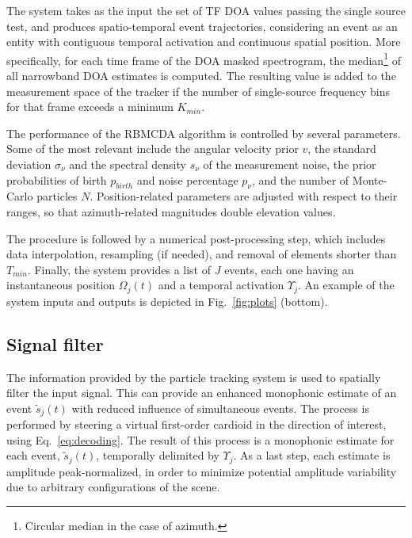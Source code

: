 The system takes as the input the set of TF DOA values passing the single source test, and produces spatio-temporal event trajectories, considering an event as an entity with contiguous temporal activation and continuous spatial position. 
More specifically, for each time frame of the DOA masked spectrogram, the median\footnote{Circular median in the case of azimuth.} of all narrowband DOA estimates is computed. The resulting value is added to the measurement space of the tracker if the number of single-source frequency bins for that frame exceeds a minimum $K_{min}$. 

The performance of the RBMCDA algorithm is controlled by several parameters. Some of the most relevant include the angular velocity prior $v$, the standard deviation $\sigma_{\nu}$ and the spectral density $s_{\nu}$ of the measurement noise, the prior probabilities of birth $p_{birth}$ and noise percentage $p_{\nu}$, and the number of Monte-Carlo particles $N$. Position-related parameters are adjusted with respect to their ranges, so that azimuth-related magnitudes double elevation values.  



The procedure is followed by a numerical post-processing step, which includes data interpolation, resampling (if needed), and removal of elements shorter than $T_{min}$.
Finally, the system provides a list of $J$ events, each one having an instantaneous position $\Omega_j(t)$ and a temporal activation $\Upsilon_j$. 
An example of the system inputs and outputs is depicted in Fig.~\ref{fig:plots} (bottom).



 
\subsection{Signal filter}

The information provided by the particle tracking system is used to spatially filter the input signal. This can provide an enhanced monophonic estimate of an event $\tilde{s}_j(t)$ with reduced influence of simultaneous events.
The process is performed by steering a virtual first-order cardioid in the direction of interest, using Eq.~\ref{eq:decoding}.
 The result of this process is a monophonic estimate for each event, $\tilde{s}_j(t)$, temporally delimited by $\Upsilon_j$. 
 As a last step, each estimate is amplitude peak-normalized, in order to minimize potential amplitude variability due to arbitrary configurations of the scene. 


